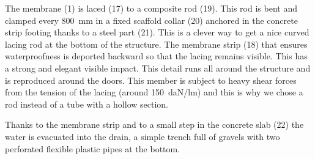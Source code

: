 The membrane (1) is laced (17) to a composite rod (19). This rod is bent and clamped every \SI{800}{mm} in a fixed scaffold collar (20) anchored in the concrete strip footing thanks to a steel part (21). This is a clever way to get a nice curved lacing rod at the bottom of the structure. The membrane strip (18) that ensures waterproofness is deported backward so that the lacing remains visible. This has a strong and elegant visible impact. This detail runs all around the structure and is reproduced around the doors. This member is subject to heavy shear forces from the tension of the lacing (around \SI{150}{daN/lm}) and this is why we chose a rod instead of a tube with a hollow section.

Thanks to the membrane strip and to a small step in the concrete slab (22) the water is evacuated into the drain, a simple trench full of gravels with two perforated flexible plastic pipes at the bottom.



